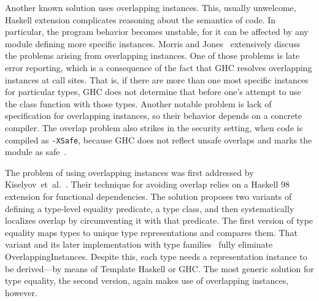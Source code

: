 \documentclass[runningheads]{llncs}
\newcommand{\K}[1]{\lstinline[style=fancy]{#1}}
\begin{document}
Another known solution uses overlapping instances. This, usually unwelcome, Haskell extension complicates reasoning about the semantics of code. In particular, the program behavior becomes unstable, for it can be affected by any module defining more specific instances. Morris and Jones~\cite{Morris2010} extensively discuss the problems arising from overlapping instances. One of those problems is late error reporting, which is a consequence of the fact that GHC resolves overlapping instances at call sites. That is, if there are more than one most specific instances for particular types, GHC does not determine that before one's attempt to use the class function with those types. Another notable problem is lack of specification for overlapping instances, so their behavior depends on a concrete compiler. 
The overlap problem also strikes in the security setting, when code is compiled as \K{-XSafe}, because GHC does not reflect unsafe overlaps and marks the module as safe~\cite{sh-overlapping}.

The problem of using overlapping instances was first addressed by Kiselyov~et~al.~\cite{Kiselyov2004}. Their technique for avoiding overlap relies on a Haskell 98 extension for functional dependencies. The solution proposes two variants of defining a type-level equality predicate, a type class, and then systematically localizes overlap by circumventing it with that predicate. The first version of type equality maps types to unique type representations and compares them. That variant and its later implementation with type families~\cite{Kiselyov2012} fully eliminate \textsf{OverlappingInstances}. Despite this, each type needs a representation instance to be derived---by means of Template Haskell or GHC. The most generic solution for type equality, the second version, again makes use of overlapping instances, however.
\end{document}

